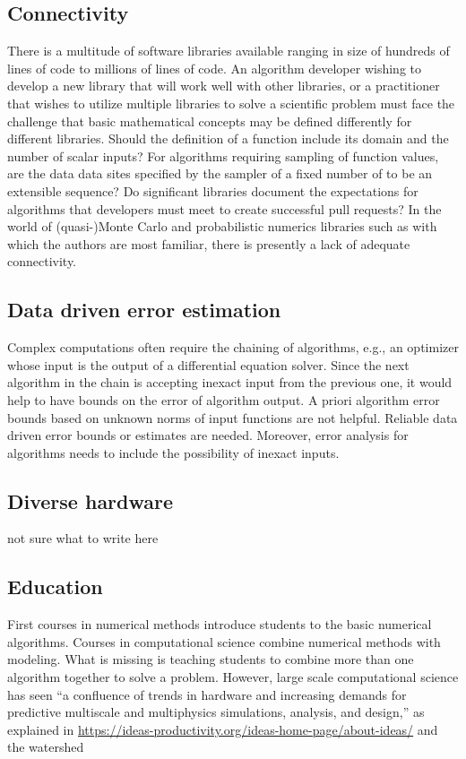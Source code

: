 \documentclass{amsart}
\begin{document}
\subsection{Connectivity} 
There is a multitude of software libraries available ranging in size of hundreds of lines of code to millions of lines of code.  An algorithm developer wishing to develop a new library that will work well with other libraries, or a practitioner that wishes to utilize multiple libraries to solve a scientific problem must face the challenge that basic mathematical concepts may be defined differently for different libraries.  Should the definition of a function include its domain and the number of scalar inputs?  For algorithms requiring sampling of function values, are the data data sites specified by the sampler of a fixed number of to be an extensible sequence?  Do significant libraries document the expectations for algorithms that developers must meet to create successful pull requests? In the world of (quasi-)Monte Carlo and probabilistic numerics libraries such as \cite{QMCPy2020a,SciPyQMC,Stan,probnum} with which the authors are most familiar, there is presently a lack of adequate connectivity.

\subsection{Data driven error estimation} 
Complex computations often require the chaining of algorithms, e.g., an optimizer whose input is the output of a differential equation solver.  Since the next algorithm in the chain is accepting inexact input from the previous one, it would help to have bounds on the error of algorithm output. A priori algorithm error bounds based on unknown norms of input functions are not helpful.  Reliable data driven error bounds or estimates are needed. Moreover, error analysis for algorithms needs to include the possibility of inexact inputs.

\subsection{Diverse hardware} {\color{blue} not sure what to write here}

\subsection{Education} 
First courses in numerical methods \cite{BurFaiBur16a} introduce students to the basic numerical algorithms.  Courses in computational science \cite{HolEic19a,ShifShif14a} combine numerical methods with modeling.  What is missing is teaching students to combine more than one algorithm together to solve a problem.  However, large scale computational science has seen  ``a confluence of trends in hardware and increasing demands for predictive multiscale and multiphysics simulations, analysis, and design,'' as explained in \url{https://ideas-productivity.org/ideas-home-page/about-ideas/} and the watershed 
\end{document}
